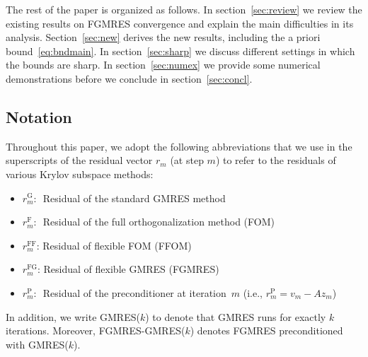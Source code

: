 \documentclass{siamart251216}
\begin{document}
The rest of the paper is organized as follows. In section~\ref{sec:review} we review the existing results on FGMRES convergence and explain the main difficulties in its analysis. Section~\ref{sec:new} derives the new results, including the a priori bound~\eqref{eq:bndmain}. In section~\ref{sec:sharp} we discuss different settings in which the bounds are sharp.
In section~\ref{sec:numex} we provide some numerical demonstrations before we conclude in section~\ref{sec:concl}.

\subsection*{Notation}

Throughout this paper, we adopt the following abbreviations that we use in the superscripts of the residual vector $r_m$ (at step $m$) to refer to the residuals of various Krylov subspace methods:
\smallskip
\begin{itemize}
    \item $r_m^{\mathrm{G}}$: \,\,Residual of the standard GMRES method
    \item $r_m^{\mathrm{F}}$: \,\,Residual of the full orthogonalization method (FOM)
    \item $r_m^{\mathrm{FF}}$: Residual of  flexible FOM (FFOM)
    \item $r_m^{\mathrm{FG}}$: Residual of  flexible GMRES (FGMRES)
    \item $r_m^{\mathrm{P}}$: \,\,Residual of the preconditioner at iteration~$m$ (i.e., $r_m^{\mathrm{P}} = v_m - A z_m$)
\end{itemize}
\smallskip
In addition, we write GMRES($k$) to denote that GMRES runs for exactly $k$ iterations. Moreover, FGMRES-GMRES($k$) denotes FGMRES preconditioned with GMRES($k$).
\end{document}
